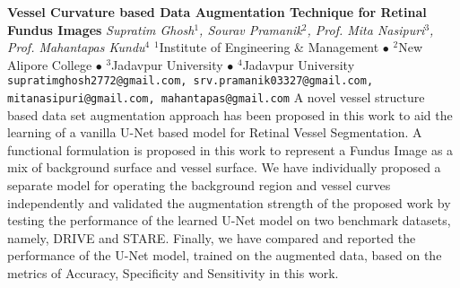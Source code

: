 
    \begin{conf-abstract}[]
        {\textbf{Vessel Curvature based Data Augmentation Technique for Retinal Fundus Images}}
        {\textit{Supratim Ghosh$^{1}$, Sourav Pramanik$^{2}$, Prof. Mita Nasipuri$^{3}$, Prof. Mahantapas Kundu$^{4}$}}
        {$^{1}$Institute of Engineering \& Management $\bullet$ $^{2}$New Alipore College $\bullet$ $^{3}$Jadavpur University $\bullet$ $^{4}$Jadavpur University}
        {\texttt{supratimghosh2772@gmail.com, srv.pramanik03327@gmail.com, mitanasipuri@gmail.com, mahantapas@gmail.com}}
        {A novel vessel structure based data set augmentation approach has been proposed in this work to aid the learning of a vanilla U-Net based model for Retinal Vessel Segmentation. A functional formulation is proposed in this work to represent a Fundus Image as a mix of background surface and vessel surface. We have individually proposed a separate model for operating the background region and vessel curves independently and validated the augmentation strength of the proposed work by testing the performance of the learned U-Net model on two benchmark datasets, namely, DRIVE and STARE. Finally, we have compared and reported the performance of the U-Net model, trained on the augmented data, based on the metrics of Accuracy, Specificity and Sensitivity in this work.}
    \end{conf-abstract}
        